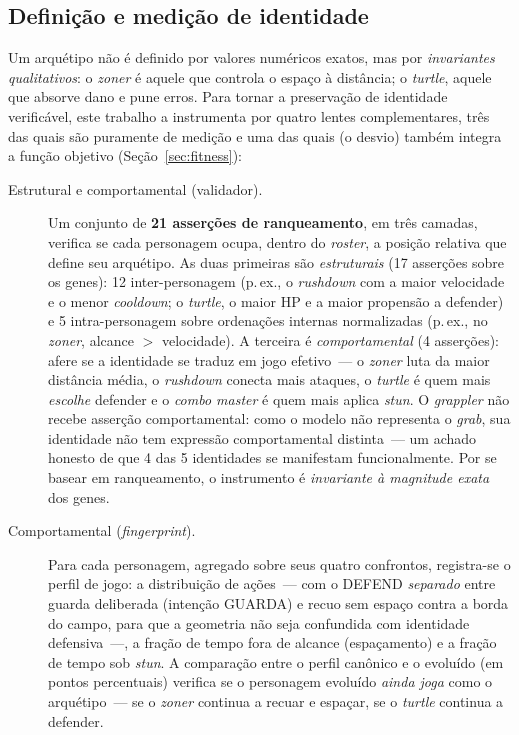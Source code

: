 \documentclass[12pt]{article}
\begin{document}
\subsection{Definição e medição de identidade}
\label{sec:identidade}

Um arquétipo não é definido por valores numéricos exatos, mas por
\emph{invariantes qualitativos}: o \emph{zoner} é aquele que controla o espaço à
distância; o \emph{turtle}, aquele que absorve dano e pune erros. Para tornar a
preservação de identidade verificável, este trabalho a instrumenta por quatro
lentes complementares, três das quais são puramente de medição e uma das quais
(o desvio) também integra a função objetivo (Seção~\ref{sec:fitness}):

\begin{description}
\item[Estrutural e comportamental (validador).] Um conjunto de \textbf{21 asserções
de ranqueamento}, em três camadas, verifica se cada personagem ocupa, dentro do
\emph{roster}, a posição relativa que define seu arquétipo. As duas primeiras são
\emph{estruturais} (17 asserções sobre os genes): 12 inter-personagem (p.\,ex., o
\emph{rushdown} com a maior velocidade e o menor \emph{cooldown}; o \emph{turtle},
o maior HP e a maior propensão a defender) e 5 intra-personagem sobre ordenações
internas normalizadas (p.\,ex., no \emph{zoner}, alcance $>$ velocidade). A terceira
é \emph{comportamental} (4 asserções): afere se a identidade se traduz em jogo
efetivo~--- o \emph{zoner} luta da maior distância média, o \emph{rushdown} conecta
mais ataques, o \emph{turtle} é quem mais \emph{escolhe} defender e o \emph{combo
master} é quem mais aplica \emph{stun}. O \emph{grappler} não recebe asserção
comportamental: como o modelo não representa o \emph{grab}, sua identidade não tem
expressão comportamental distinta~--- um achado honesto de que 4 das 5 identidades
se manifestam funcionalmente. Por se basear em ranqueamento, o instrumento é
\emph{invariante à magnitude exata} dos genes.

\item[Comportamental (\emph{fingerprint}).] Para cada personagem, agregado sobre
seus quatro confrontos, registra-se o perfil de jogo: a distribuição de ações~---
com o DEFEND \emph{separado} entre guarda deliberada (intenção GUARDA) e recuo sem
espaço contra a borda do campo, para que a geometria não seja confundida com
identidade defensiva~---, a fração de tempo fora de alcance (espaçamento) e
a fração de tempo sob \emph{stun}. A comparação entre o perfil canônico e o
evoluído (em pontos percentuais) verifica se o personagem evoluído \emph{ainda
joga} como o arquétipo~--- se o \emph{zoner} continua a recuar e espaçar, se o
\emph{turtle} continua a defender.


\end{description}
\end{document}
